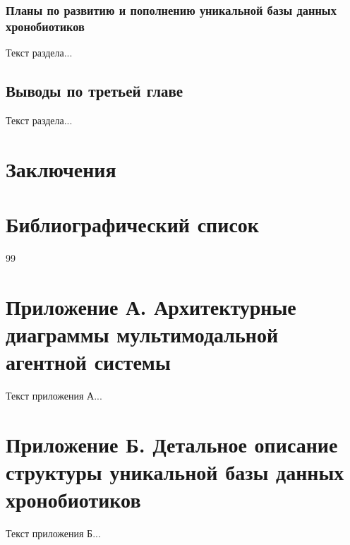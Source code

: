 \subsubsection{Планы по развитию и пополнению уникальной базы данных хронобиотиков}

Текст раздела...

\subsection{Выводы по третьей главе}

Текст раздела...

\newpage

\section*{Заключения}



\newpage

\section*{Библиографический список}

\begin{thebibliography}{99}
	

\end{thebibliography}

\newpage

\section*{Приложение А. Архитектурные диаграммы мультимодальной агентной системы}

Текст приложения А...

\newpage

\section*{Приложение Б. Детальное описание структуры уникальной базы данных хронобиотиков}

Текст приложения Б...

